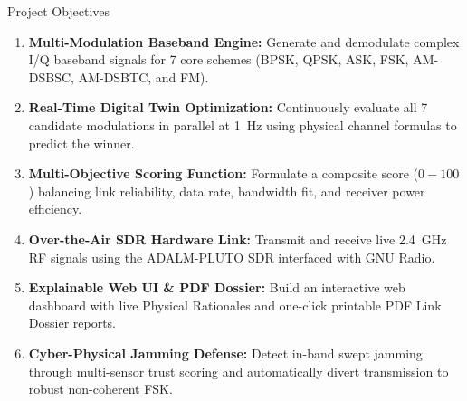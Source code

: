 \documentclass[aspectratio=169, 10pt]{beamer}
\begin{document}
\begin{frame}{Project Objectives}
  \begin{enumerate}\setlength{\itemsep}{9pt}\normalsize
    \item \textbf{Multi-Modulation Baseband Engine:} Generate and demodulate complex I/Q baseband signals for 7 core schemes (BPSK, QPSK, ASK, FSK, AM-DSBSC, AM-DSBTC, and FM).
    \item \textbf{Real-Time Digital Twin Optimization:} Continuously evaluate all 7 candidate modulations in parallel at 1~Hz using physical channel formulas to predict the winner.
    \item \textbf{Multi-Objective Scoring Function:} Formulate a composite score ($0-100$) balancing link reliability, data rate, bandwidth fit, and receiver power efficiency.
    \item \textbf{Over-the-Air SDR Hardware Link:} Transmit and receive live 2.4~GHz RF signals using the ADALM-PLUTO SDR interfaced with GNU Radio.
    \item \textbf{Explainable Web UI \& PDF Dossier:} Build an interactive web dashboard with live Physical Rationales and one-click printable PDF Link Dossier reports.
    \item \textbf{Cyber-Physical Jamming Defense:} Detect in-band swept jamming through multi-sensor trust scoring and automatically divert transmission to robust non-coherent FSK.
  \end{enumerate}
\end{frame}
\end{document}
